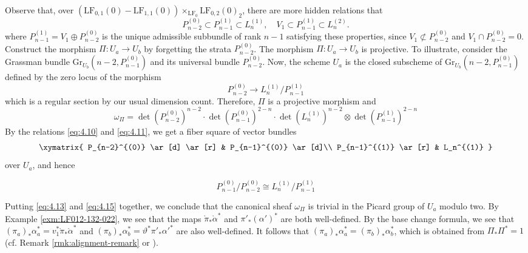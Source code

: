 \documentclass[a4paper]{amsart}
\theoremstyle{plain}
\theoremstyle{definition}
\numberwithin{equation}{section}
\newcommand{\Gr}{\mathrm{Gr}}
\newcommand{\LF}{\mathrm{LF}}
\begin{document}
Observe that, over $(\LF_{0,1}(0) - \LF_{1,1}(0)) \times_{\LF_0} \mathrm{LF}_{0,2}(0)_2 $, there are more  hidden relations that
\begin{equation}\label{eq:4.11} P_{n-2}^{(0)} \subset P_{n-1}^{(1)} \subset L_n^{(1)}, \quad V_1 \subset P_{n-1}^{(1)} \subset L_{n}^{(2)}.  \end{equation}
where $P_{n-1}^{(1)} = V_1 \oplus P_{n-2}^{(0)}$ is the unique admissible subbundle of rank $n-1$ satisfying these properties, since $V_1 \not \subset P_{n-2}^{(0)}$ and $V_1 \cap P_{n-2}^{(0)} = 0$. Construct the morphism $\Pi: {U}_a \to U_b$ by forgetting the strata $P_{n-2}^{(0)}$. The morphism $\Pi: {U}_a \to U_b$ is projective. To illustrate, consider the Grassman bundle $\Gr_{U_b}(n-2, P_{n-1}^{(0)})$ and its universal bundle $P_{n-2}^{(0)}$. Now, the scheme ${U}_a$ is the closed subscheme of $\Gr_{U_b}(n-2, P_{n-1}^{(0)})$ defined by the zero locus of the morphism
\begin{equation}\label{eq:4.12}  P_{n-2}^{(0)} \to L_n^{(1)}/ P_{n-1}^{(1)} \end{equation}
which is a regular section by our usual dimension count. Therefore, $\Pi$ is a projective morphism and
\begin{equation}\label{eq:4.13} \omega_{\Pi} = \det(P_{n-2}^{(0)})^{n-2} \cdot \det(P_{n-1}^{(0)})^{2-n} \cdot  \det (L_{n}^{(1)})^{n-2} \otimes \det(P_{n-1}^{(1)})^{2-n}  \end{equation}
By the relations \eqref{eq:4.10} and \eqref{eq:4.11}, we get a fiber square of vector bundles
\begin{equation}\label{eq:4.14}
    \xymatrix{
    P_{n-2}^{(0)} \ar[d] \ar[r] & P_{n-1}^{(0)} \ar[d]\\
    P_{n-1}^{(1)}  \ar[r] &  L_n^{(1)}
    }
\end{equation}
over ${U}_a$, and hence

\begin{equation}\label{eq:4.15}
    P_{n-1}^{(0)}/ P_{n-2}^{(0)}  \cong L_n^{(1)}/ P_{n-1}^{(1)}
\end{equation}

Putting \eqref{eq:4.13} and \eqref{eq:4.15} together, we  conclude that the canonical sheaf $\omega_\Pi$ is trivial in the Picard group of ${U}_a$ modulo two.
By Example \ref{exm:LF012-132-022}, we see that the maps $\grave{\pi}_*\grave{\alpha}^*$ and $\pi'_*(\alpha')^*$ are both well-defined. By the base change formula, we see that $(\pi_a)_*\alpha_a^* = v_1^* \grave{\pi}_*\grave{\alpha}^* $ and $(\pi_b)_*\alpha_b^* = \vartheta^* \pi'_*\alpha'^* $ are also well-defined. It follows that $(\pi_a)_*\alpha_a^* = (\pi_b)_*\alpha_b^* $, which is obtained from $\Pi_*\Pi^* = 1$ (cf. Remark  \ref{rmk:alignment-remark} or \cite[Proposition 3.15]{balmer2012witt}).
\end{document}
